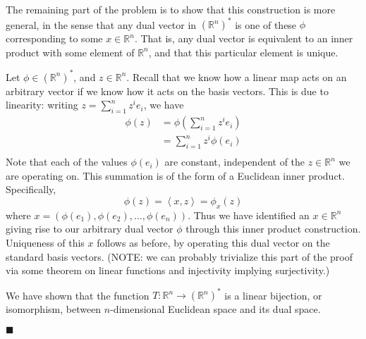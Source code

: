 \documentclass[12pt]{article}
\renewcommand{\qed}{\hfill$\blacksquare$}
\renewenvironment{proof}{\begin{addmargin}[1em]{0em}\begin{newproof}}{\end{newproof}\end{addmargin}\qed}
\begin{document}
\begin{proof}
The remaining part of the problem is to show that this construction is more general, in the sense that any dual vector in $\left( \mathbb{R}^n\right)^*$ is one of these $\phi$ corresponding to some $x\in \mathbb{R}^n$.  That is, any dual vector is equivalent to an inner product with some element of $\mathbb{R}^n$, and that this particular element is unique.

Let $\phi \in \left(\mathbb{R}^n\right)^*$, and $z\in \mathbb{R}^n$. Recall that we know how a linear map acts on an arbitrary vector if we know how it acts on the basis vectors. This is due to linearity: writing $z = \sum_{i=1}^n z^i e_i $, we have
\begin{equation*}
\begin{split} 
\phi \left(z\right) & = \phi \left( \sum_{i=1}^n z^i e_i \right) \\
& = \sum_{i=1}^n z^i \phi \left(e_i\right) \\
\end{split}
\end{equation*}
Note that each of the values $\phi\left(e_i\right)$ are constant, independent of the $z \in \mathbb{R}^n$ we are operating on. This summation is of the form of a Euclidean inner product. Specifically,
\begin{equation*}
\phi\left(z\right) = \left\langle x, z \right\rangle = \phi_x \left(z\right)
\end{equation*}
where $x = \left( \phi\left(e_1\right), \phi\left(e_2\right), \ldots, \phi\left(e_n\right) \right)$. Thus we have identified an $x\in \mathbb{R}^n$ giving rise to our arbitrary dual vector $\phi$ through this inner product construction. Uniqueness of this $x$ follows as before, by operating this dual vector on the standard basis vectors. (NOTE: we can probably trivialize this part of the proof via some theorem on linear functions and injectivity implying surjectivity.)

We have shown that the function $ T:\mathbb{R}^n \rightarrow \left(\mathbb{R}^n\right)^*$ is a linear bijection, or isomorphism, between $n$-dimensional Euclidean space and its dual space.
\end{proof}
 
 
 
 
 
\end{document}
